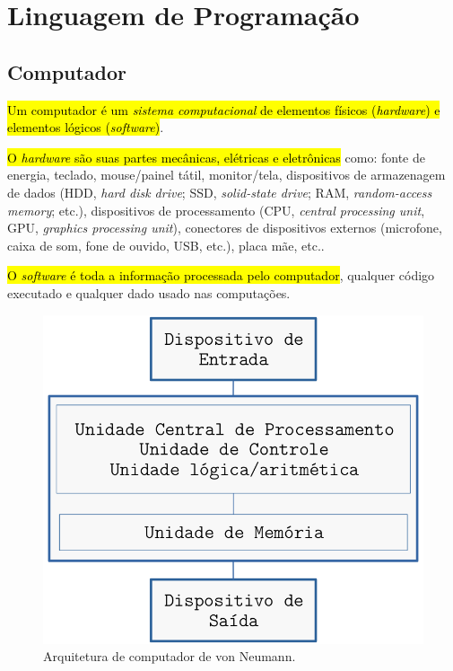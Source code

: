 

\chapter{Linguagem de Programação}\label{cap_lingua}

\section{Computador}\label{cap_lim_sec_computador}

\hl{Um computador é um \emph{sistema computacional} de elementos físicos (\emph{hardware}) e elementos lógicos (\emph{software})}.

\hl{O \emph{hardware} são suas partes mecânicas, elétricas e eletrônicas} como: fonte de energia, teclado, mouse/painel tátil, monitor/tela, dispositivos de armazenagem de dados (HDD, \textit{hard disk drive}; SSD, \textit{solid-state drive}; RAM, \textit{random-access memory}; etc.), dispositivos de processamento (CPU, \textit{central processing unit}, GPU, \textit{graphics processing unit}), conectores de dispositivos externos (microfone, caixa de som, fone de ouvido, USB, etc.), placa mãe, etc..

\hl{O \emph{software} é toda a informação processada pelo computador}, qualquer código executado e qualquer dado usado nas computações.

\begin{figure}[H]
  \centering
  \includegraphics[width=4.75in]{./cap_lingua/dados/fig_arqVonNeumann/fig.png}
  \caption[Arquitetura de von Neumann]{Arquitetura de computador de von Neumann.}
  \label{cap_lim_sec_computador:fig:arqVonNeumann}
\end{figure}

